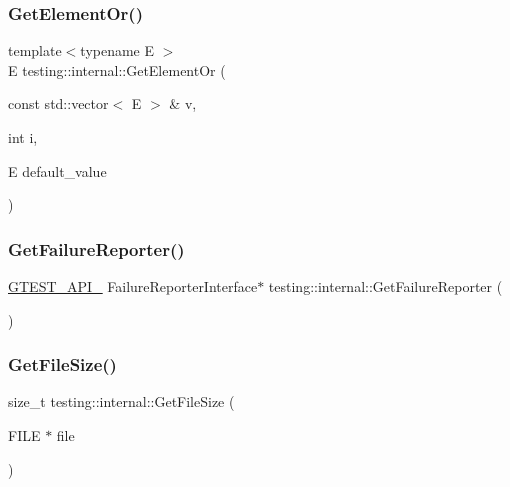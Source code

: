 \mbox{\label{namespacetesting_1_1internal_a71fdd20a0686bea3dc0cdcd95e0bca1c}} 
\subsubsection{\texorpdfstring{Get\+Element\+Or()}{GetElementOr()}}
{\footnotesize\ttfamily template$<$typename E $>$ \\
E testing\+::internal\+::\+Get\+Element\+Or (\begin{DoxyParamCaption}\item[{const std\+::vector$<$ E $>$ \&}]{v,  }\item[{int}]{i,  }\item[{E}]{default\+\_\+value }\end{DoxyParamCaption})\hspace{0.3cm}{\ttfamily [inline]}}

\mbox{\label{namespacetesting_1_1internal_aa261c22df383e9007129c92e36e30e62}} 
\subsubsection{\texorpdfstring{Get\+Failure\+Reporter()}{GetFailureReporter()}}
{\footnotesize\ttfamily \hyperlink{gtest-port_8h_aa73be6f0ba4a7456180a94904ce17790}{G\+T\+E\+S\+T\+\_\+\+A\+P\+I\+\_\+} Failure\+Reporter\+Interface$\ast$ testing\+::internal\+::\+Get\+Failure\+Reporter (\begin{DoxyParamCaption}{ }\end{DoxyParamCaption})}

\mbox{\label{namespacetesting_1_1internal_a06ca3f65f5e85c9ce7299b9e4cd52408}} 
\subsubsection{\texorpdfstring{Get\+File\+Size()}{GetFileSize()}}
{\footnotesize\ttfamily size\+\_\+t testing\+::internal\+::\+Get\+File\+Size (\begin{DoxyParamCaption}\item[{F\+I\+LE $\ast$}]{file }\end{DoxyParamCaption})}

